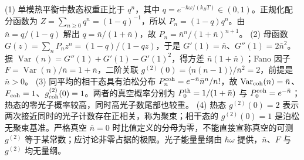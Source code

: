 (1) 单模热平衡中数态权重正比于 \(q^n\)，其中 \(q=e^{-\hbar\omega/(k_BT)}\in(0,1)\)。正规化配分函数为 \(Z=\sum_{n\ge0}q^n=(1-q)^{-1}\)，所以 \(P_n=(1-q)q^n\)。由 \(\bar n=q/(1-q)\) 解出 \(q=\bar n/(1+\bar n)\)，故 \(P_n=\bar n^n/(1+\bar n)^{n+1}\)。
(2) 母函数 \(G(z)=\sum_nP_n z^n=(1-q)/(1-qz)\)，于是 \(G'(1)=\bar n\)、\(G''(1)=2\bar n^2\)。据 \(\operatorname{Var}(n)=G''(1)+G'(1)-G'(1)^2\)，得方差 \(\bar n(1+\bar n)\)；Fano 因子 \(F=\operatorname{Var}(n)/\bar n=1+\bar n\)，二阶关联 \(g^{(2)}(0)=\langle n(n-1)\rangle/\bar n^2=2\)，前提是 \(\bar n>0\)。
(3) 同平均的相干态具有泊松分布 \(P_n^{\rm coh}=e^{-\bar n}\bar n^n/n!\)，故 \(\operatorname{Var}_{\rm coh}(n)=\bar n\)、\(F_{\rm coh}=1\)、\(g_{\rm coh}^{(2)}(0)=1\)。两者的真空概率分别为 \(P_0^{\rm th}=1/(1+\bar n)\) 与 \(P_0^{\rm coh}=e^{-\bar n}\)；热态的零光子概率较高，同时高光子数尾部也较重。
(4) 热态 \(g^{(2)}(0)=2\) 表示两次接近同时的光子计数存在正相关，称为聚束；相干态的 \(g^{(2)}(0)=1\) 是泊松无聚束基准。严格真空 \(\bar n=0\) 时比值定义的分母为零，不能直接宣称真空的可测 \(g^{(2)}\) 等于某常数；应讨论非零占据的极限。光子能量量纲由 \(\hbar\omega\) 提供，\(\bar n\)、\(F\) 与 \(g^{(2)}\) 均无量纲。
